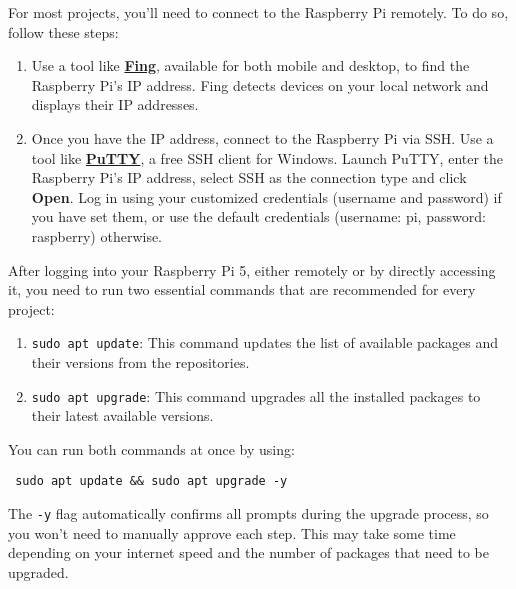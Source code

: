 For most projects, you'll need to connect to the Raspberry Pi remotely. To do so, follow these steps:
\begin{enumerate}
\item Use a tool like \href{https://www.fing.com/}{\textbf{\color{blue}Fing}}, available for both mobile and desktop, to find the Raspberry Pi's IP address. Fing detects devices on your local network and displays their IP addresses. 
\item Once you have the IP address, connect to the Raspberry Pi via SSH. Use a tool like \href{https://www.chiark.greenend.org.uk/~sgtatham/putty/}{\textbf{\color{blue}PuTTY}}, a free SSH client for Windows. Launch PuTTY, enter the Raspberry Pi's IP address, select SSH as the connection type and click \textbf{Open}. Log in using your customized credentials (username and password) if you have set them, or use the default credentials (username: pi, password: raspberry) otherwise.
\end{enumerate}

After logging into your Raspberry Pi 5, either remotely or by directly accessing it, you need to run two essential commands that are recommended for every project:
\begin{enumerate}
\item \texttt{sudo apt update}: This command updates the list of available packages and their versions from the repositories.
\item \texttt{sudo apt upgrade}: This command upgrades all the installed packages to their latest available versions.
\end{enumerate}

You can run both commands at once by using:
\begin{verbatim} sudo apt update && sudo apt upgrade -y \end{verbatim}

The \texttt{-y} flag automatically confirms all prompts during the upgrade process, so you won't need to manually approve each step. This may take some time depending on your internet speed and the number of packages that need to be upgraded.
